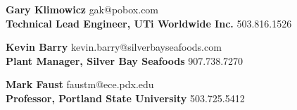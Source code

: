 \item
\headerrow
  {\textbf{Gary Klimowicz}}
  {gak@pobox.com}
\\
\headerrow
  {\textbf{Technical Lead Engineer, UTi Worldwide Inc.}}
  {503.816.1526}
\item
\headerrow
  {\textbf{Kevin Barry}}
  {kevin.barry@silverbayseafoods.com}
\\
\headerrow
  {\textbf{Plant Manager, Silver Bay Seafoods}}
  {907.738.7270}
\item
\headerrow
  {\textbf{Mark Faust}}
  {faustm@ece.pdx.edu}
\\
\headerrow
  {\textbf{Professor, Portland State University}}
  {503.725.5412}
  
